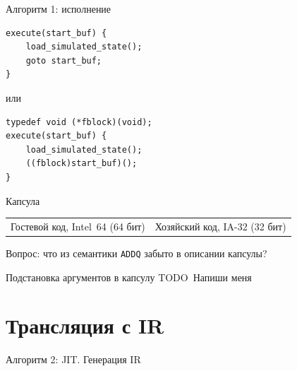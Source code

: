 \documentclass{beamer}
\newcommand{\todo}[1][Напиши меня]{{\color{red}TODO\ #1}}
\begin{document}
\begin{frame}[fragile]{Алгоритм 1: исполнение}

\begin{verbatim}
execute(start_buf) {
    load_simulated_state();
    goto start_buf;
}
\end{verbatim}
\pause
или
\begin{verbatim}
typedef void (*fblock)(void);
execute(start_buf) {
    load_simulated_state();
    ((fblock)start_buf)();
}
\end{verbatim}

\end{frame}

\begin{frame}{Капсула}

\begin{small}
\begin{tabular}{p{}p{}}
Гостевой код, Intel~64 (64 бит) & Хозяйский код, IA-32 (32 бит)
\end{tabular}
\end{small}

\vfill

\centering
\pause

Вопрос: что из семантики \texttt{ADDQ} забыто в описании капсулы?
\end{frame}

\begin{frame}{Подстановка аргументов в капсулу}
    \todo
\end{frame}

\section{Трансляция с IR}

\begin{frame}{Алгоритм 2: JIT. Генерация IR}
\centering
{}
\end{frame}
\end{document}
